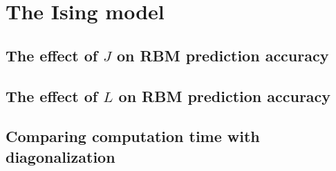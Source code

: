 \section{The Ising model}
\subsection{The effect of \texorpdfstring{$J$}{J} on RBM prediction accuracy}
\subsection{The effect of \texorpdfstring{$L$}{L} on RBM prediction accuracy}
\subsection{Comparing computation time with diagonalization}
